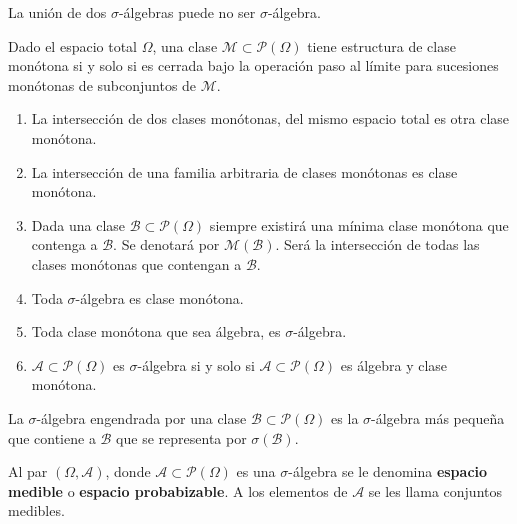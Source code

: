 \begin{observation}
La unión de dos $\displaystyle \sigma  $-álgebras puede no ser $\displaystyle \sigma  $-álgebra.
\end{observation}
\begin{definition}
Dado el espacio total $\displaystyle \Omega  $, una clase $\displaystyle \mathcal{M} \subset \mathcal{P}\left(\Omega \right) $ tiene estructura de clase monótona si y solo si es cerrada bajo la operación paso al límite para sucesiones monótonas de subconjuntos de $\displaystyle \mathcal{M} $.
\end{definition}
\begin{prop}
\begin{enumerate}
\item La intersección de dos clases monótonas, del mismo espacio total es otra clase monótona.
\item La intersección de una familia arbitraria de clases monótonas es clase monótona. 
\item Dada una clase $\displaystyle \mathcal{B} \subset \mathcal{P}\left(\Omega \right) $ siempre existirá una mínima clase monótona que contenga a $\displaystyle \mathcal{B} $. Se denotará por $\displaystyle \mathcal{M}\left(\mathcal{B}\right) $. Será la intersección de todas las clases monótonas que contengan a $\displaystyle \mathcal{B} $.
\item Toda $\displaystyle \sigma  $-álgebra es clase monótona.
\item Toda clase monótona que sea álgebra, es $\displaystyle \sigma  $-álgebra.
\item $\displaystyle \mathcal{A} \subset \mathcal{P}\left(\Omega \right) $ es $\displaystyle \sigma  $-álgebra si y solo si $\displaystyle \mathcal{A} \subset \mathcal{P}\left(\Omega \right) $ es álgebra y clase monótona.
\end{enumerate}
\end{prop}
\begin{definition}
La $\displaystyle \sigma  $-álgebra engendrada por una clase $\displaystyle \mathcal{B}\subset \mathcal{P}\left(\Omega \right) $ es la $\displaystyle \sigma  $-álgebra más pequeña que contiene a $\displaystyle \mathcal{B} $ que se representa por $\displaystyle \sigma\left(\mathcal{B}\right) $.
\end{definition}
\begin{definition}
Al par $\displaystyle \left(\Omega, \mathcal{A}\right) $, donde $\displaystyle \mathcal{A} \subset \mathcal{P}\left(\Omega \right) $ es una $\displaystyle \sigma  $-álgebra se le denomina \textbf{espacio medible} o \textbf{espacio probabizable}. A los elementos de $\displaystyle \mathcal{A} $ se les llama conjuntos medibles.
\end{definition}

